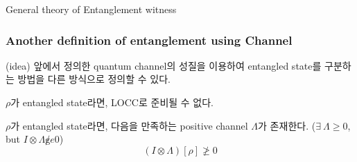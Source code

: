 \documentclass[9pt]{beamer}
\begin{document}
\begin{section}{General theory of  Entanglement witness}
        \begin{frame}
            \frametitle{Another definition of entanglement using Channel}
            (idea) 앞에서 정의한 quantum channel의 성질을 이용하여 entangled state를 구분하는 방법을 다른 방식으로 정의할 수 있다. 
            \begin{definition}
                $\rho$가 entangled state라면, LOCC로 준비될 수 없다.
            \end{definition}
            \begin{definition}
                $\rho$가 entangled state라면, 다음을 만족하는 positive channel $\Lambda$가 존재한다. ($\exists \ \Lambda \ge 0$, but $I \otimes \Lambda \not ge 0$)
                \begin{equation*}
                    (I \otimes \Lambda) [\rho] \not \ge 0
                \end{equation*}
            \end{definition}
        \end{frame}


\end{section}
\end{document}
